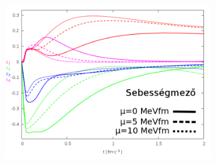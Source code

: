 \documentclass{beamer}
\begin{document}
\begin{frame}
\begin{center}
\begin{figure}[H]
\begin{subfigure}[b]{0.49\textwidth}
	\end{subfigure}
	\begin{subfigure}[b]{0.49\textwidth}
        	\includegraphics[width=\textwidth]{pic/res/nonrel/eps_visc_v}
	\end{subfigure}
\end{figure}
\end{center}
\end{frame}
\end{document}

